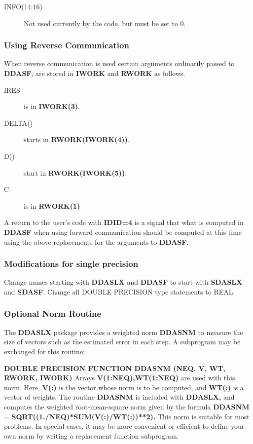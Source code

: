 \documentclass[twoside]{MATH77}
\begin{document}
\begin{description}
\item[INFO(14:16)] Not used currently by the code, but must be set to 0.
\end{description}

\subsubsection{Using Reverse Communication\label{revcom}}

When reverse communication is used certain arguments ordinarily passed to
\textbf{DDASF}, are stored in \textbf{IWORK} and \textbf{RWORK} as follows.
\begin{description}
\item[IRES] is in \textbf{IWORK(3)}.
\item[DELTA()] starts in \textbf{RWORK(IWORK(4))}.
\item[D()] start in \textbf{RWORK(IWORK(5))}.
\item[C] is in \textbf{RWORK(1)}
\end{description}
A return to the user's code with \textbf{IDID=4} is a signal that what is
computed in \textbf{DDASF} when using forward communication should be computed
at this time using the above replacements for the arguments to \textbf{DDASF}.

\subsubsection{Modifications for single precision \label{Sngl}}

Change names starting with \textbf{DDASLX} and \textbf{DDASF} to start with
\textbf{SDASLX} and \textbf{SDASF}.
Change all DOUBLE PRECISION type statements to REAL.


\subsubsection{Optional Norm Routine\label{NORM}}
The \textbf{DDASLX} package provides a weighted norm \textbf{DDASNM} to
measure the size of vectors such as the estimated error in each step.  A
subprogram may be exchanged for this routine: \raggedright\textbf{DOUBLE
  PRECISION FUNCTION DDASNM (NEQ, V, WT, RWORK, IWORK)} Arrays
\textbf{V(1:NEQ),WT(1:NEQ)} are used with this norm. Here, \textbf{V(:)} is
the vector whose norm is to be computed, and \textbf{WT(:)} is a vector of
weights. The routine \textbf{DDASNM }is included with \textbf{DDASLX,} and
computes the weighted root-mean-square norm given by the formula
\textbf{DDASNM} = \textbf{SQRT((1./NEQ)*SUM(V(:)/WT(:))**2).}  This norm is
suitable for most problems.  In special cases, it may be more convenient or
efficient to define your own norm by writing a replacement function
subprogram.
\end{document}
